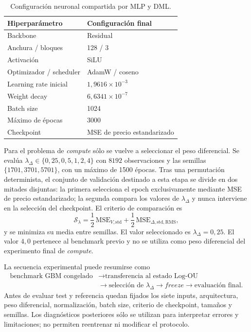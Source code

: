 \begin{table}[htbp]
    \centering
    \caption{Configuración neuronal compartida por MLP y DML.}
    \label{tab:shared_ml_configuration}
    \begin{tabular}{ll}
        \toprule
        Hiperparámetro & Configuración final \\
        \midrule
        Backbone & Residual \\
        Anchura / bloques & 128 / 3 \\
        Activación & SiLU \\
        Optimizador / scheduler & AdamW / coseno \\
        Learning rate inicial & $1{,}9616\times10^{-3}$ \\
        Weight decay & $6{,}6341\times10^{-7}$ \\
        Batch size & 1024 \\
        Máximo de épocas & 3000 \\
        Checkpoint & MSE de precio estandarizado \\
        \bottomrule
    \end{tabular}
\end{table}

Para el problema de \textit{compute} sólo se vuelve a seleccionar el peso
diferencial. Se evalúa
$\lambda_\Delta\in\{0{,}25,0{,}5,1,2,4\}$ con $8192$ observaciones y las semillas
$\{1701,3701,5701\}$, con un máximo de 1500 épocas. Tras una permutación
determinista, el conjunto de validación destinado a esta etapa se divide en dos
mitades disjuntas: la primera selecciona el epoch exclusivamente mediante MSE de
precio estandarizado; la segunda compara los valores de $\lambda_\Delta$ y nunca
interviene en la selección del checkpoint. El criterio de comparación es
\begin{equation}
    \mathcal S_{\lambda}
    =\frac{1}{2}\,\mathrm{MSE}_{V,\mathrm{std}}
    +\frac{1}{2}\,\mathrm{MSE}_{\Delta,\mathrm{std,RMS}},
    \label{eq:lambda_selection_score}
\end{equation}
y se minimiza su media entre semillas. El valor seleccionado es
$\lambda_\Delta=0{,}25$. El valor $4{,}0$ pertenece al benchmark previo y no se
utiliza como peso diferencial del experimento final de \textit{compute}.

La secuencia experimental puede resumirse como
\begin{equation}
    \begin{aligned}
        \text{benchmark GBM congelado}
        &\rightarrow \text{transferencia al estado Log-OU} \\
        &\rightarrow \text{selección de }\lambda_\Delta
        \rightarrow \textit{freeze}
        \rightarrow \text{evaluación final}.
    \end{aligned}
    \label{eq:model_selection_pipeline}
\end{equation}
Antes de evaluar test y referencia quedan fijados los siete inputs, arquitectura,
peso diferencial, normalización, batch size, criterio de checkpoint, tamaños y
semillas. Los diagnósticos posteriores sólo se utilizan para interpretar errores
y limitaciones; no permiten reentrenar ni modificar el protocolo.


